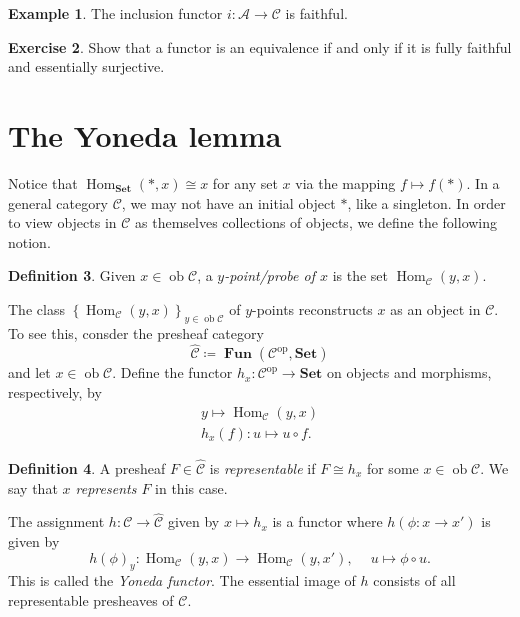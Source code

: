 \documentclass[10pt,letterpaper,cm]{nupset}
\theoremstyle{definition}
\newtheorem{definition}{Definition}[subsection]
\newtheorem{exmp}[definition]{Example}
\theoremstyle{theorem}
\newtheorem{exercise}[definition]{Exercise}
\theoremstyle{remark}
\newcommand{\1}{\mathbf{1}}
\renewcommand{\a}{\mathscr{A}}
\renewcommand{\c}{\mathscr{C}}
\newcommand{\0}{\vec 0}
\DeclareMathOperator{\op}{op}
\DeclareMathOperator{\ob}{ob}
\DeclareMathOperator{\Hom}{Hom}
\DeclareMathOperator{\Fun}{\mathbf{Fun}}
\begin{document}
\begin{exmp}
The inclusion functor $i : \a \to \c$ is faithful.
\end{exmp}


\begin{exercise}
Show that a functor is an equivalence if and only if it is fully faithful and essentially surjective.
\end{exercise}



\section{The Yoneda lemma}

Notice that $\Hom_{\mathbf{Set}}(\ast, x) \cong x$ for any set $x$ via the mapping $f \mapsto f(\ast)$. In a general category $\c$, we may not have an initial object $\ast$, like a singleton. In order to view objects in $\c$ as themselves collections of objects, we define the following notion.

\begin{definition}
Given $x \in \ob \c$, a \textit{$y$-point/probe of $x$} is the set $\Hom_{\c}(y, x)$.
\end{definition}
The class $\left\{\Hom_{\c}(y, x)\right\}_{y\in \ob \c}$ of $y$-points reconstructs $x$ as an object in $\c$. To see this, consder the presheaf category $$\widehat{\c}\coloneqq  \Fun(\c^{\op}, \mathbf{Set})$$ and let $x \in \ob \c$. Define the functor $h_x : \c^{\op} \to \mathbf{Set}$ on objects and morphisms, respectively, by 
\begin{gather*}
y \mapsto \Hom_{\c}(y, x)
\\ h_x(f) : u \mapsto u \circ f.
\end{gather*}

\begin{definition}
A presheaf $F \in \widehat{\c}$ is \textit{representable} if $F \cong h_x$ for some $x\in \ob{\c}$. We say that \textit{$x$ represents $F$} in this case.
\end{definition}
The assignment $h: \c \to \widehat{\c}$ given by $x \mapsto h_x$ is a functor where $h(\phi : x \to x')$ is given by $$h(\phi)_y : \Hom_{\c}(y, x) \to \Hom_{\c}(y, x'),\ \quad u \mapsto \phi \circ u.$$ This is called the \textit{Yoneda functor}. The essential image of $h$ consists of all representable presheaves of $\c$.
\end{document}
